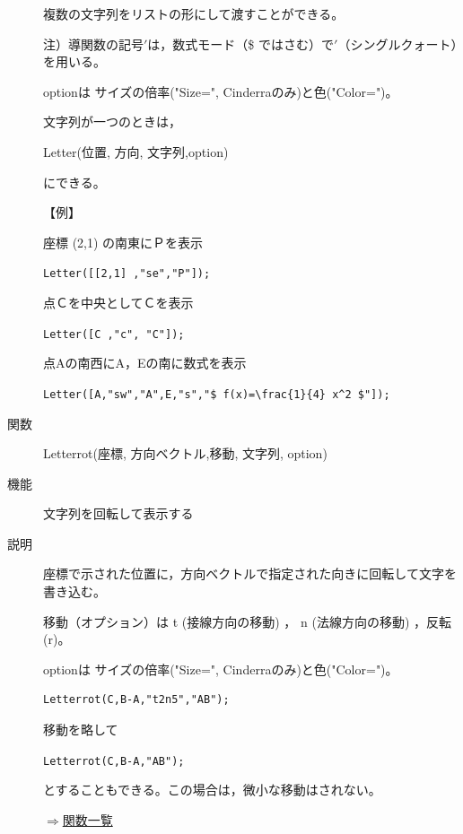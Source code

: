 \documentclass[papersize,a4paper,12pt,uplatex]{jsarticle}
\begin{document}
\begin{description}
複数の文字列をリストの形にして渡すことができる。

注）導関数の記号$'$は，数式モード（\$ ではさむ）で$'$（シングルクォート）を用いる。

optionは サイズの倍率("Size=", Cinderraのみ)と色("Color=")。

文字列が一つのときは，

Letter(位置, 方向, 文字列,option)

にできる。

\vspace{\baselineskip}
【例】

座標 (2,1) の南東にＰを表示

\hspace{10mm}\verb|Letter([[2,1] ,"se","P"]);|

点Ｃを中央としてＣを表示

\hspace{10mm}\verb|Letter([C ,"c", "C"]);|

点Aの南西にA，Eの南に数式を表示

\hspace{10mm}\verb|Letter([A,"sw","A",E,"s","$ f(x)=\frac{1}{4} x^2 $"]);| 

\vspace{\baselineskip}
\hypertarget{letterrot}{}\item[関数]Letterrot(座標, 方向ベクトル,移動, 文字列, option)
\item[機能]文字列を回転して表示する
\item[説明]座標で示された位置に，方向ベクトルで指定された向きに回転して文字を書き込む。

移動（オプション）は t (接線方向の移動) ， n (法線方向の移動) ，反転 (r)。

optionは サイズの倍率("Size=", Cinderraのみ)と色("Color=")。

\begin{verbatim}
Letterrot(C,B-A,"t2n5","AB");
\end{verbatim}

移動を略して

\hspace{10mm}\verb|Letterrot(C,B-A,"AB");|

とすることもできる。この場合は，微小な移動はされない。

\begin{flushright}\hyperlink{functionlist}{$\Rightarrow$関数一覧}\end{flushright}

\end{description}
\end{document}
